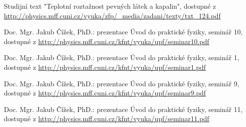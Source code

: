 \documentclass[protokol.tex]{subfiles}
\begin{document}
\begin{thebibliography}{}

Studijní text "Teplotní roztažnost pevných látek a kapalin", dostupné z\\ 
\url{http://physics.mff.cuni.cz/vyuka/zfp/_media/zadani/texty/txt_124.pdf}

Doc. Mgr. Jakub Čížek, PhD.: prezentace Úvod do praktické fyziky, seminář 10, dostupné z \url{http://physics.mff.cuni.cz/kfnt/vyuka/upf/seminar10.pdf}

Doc. Mgr. Jakub Čížek, PhD.: prezentace Úvod do praktické fyziky, seminář 1, dostupné z \url{http://physics.mff.cuni.cz/kfnt/vyuka/upf/seminar1.pdf}

Doc. Mgr. Jakub Čížek, PhD.: prezentace Úvod do praktické fyziky, seminář 9, dostupné z \url{http://physics.mff.cuni.cz/kfnt/vyuka/upf/seminar9.pdf}


Doc. Mgr. Jakub Čížek, PhD.: prezentace Úvod do praktické fyziky, seminář 11, dostupné z \url{http://physics.mff.cuni.cz/kfnt/vyuka/upf/seminar11.pdf}
\end{thebibliography}
\end{document}
